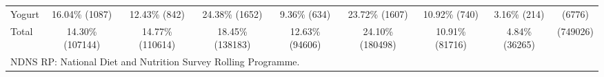 \documentclass[utf8]{frontiers_suppmat} %
\newcommand{\elandscape}{\end{landscape}}
\begin{document}
\begin{table}[]
{\begin{tabular}{@{}lcccccccc@{}}
Yogurt                    & 16.04\%   (1087) & 12.43\%    (842) & 24.38\%   (1652) & 9.36\%   (634)  & 23.72\%   (1607) & 10.92\%   (740) & 3.16\%   (214)  &    (6776) \\
Total                     & 14.30\% (107144) & 14.77\% (110614) & 18.45\% (138183) & 12.63\% (94606) & 24.10\% (180498) & 10.91\% (81716) & 4.84\% (36265)  &  (749026) \\ \bottomrule
		\multicolumn{9}{l}{NDNS RP: National Diet and Nutrition Survey Rolling Programme. }
\end{tabular}
}
\end{table}

\end{document}
